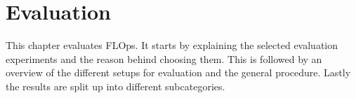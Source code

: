 \chapter{Evaluation}\label{chapter:evaluation}

This chapter evaluates FLOps.
It starts by explaining the selected evaluation experiments and the reason behind choosing them.
This is followed by an overview of the different setups for evaluation and the general procedure.
Lastly the results are split up into different subcategories.





